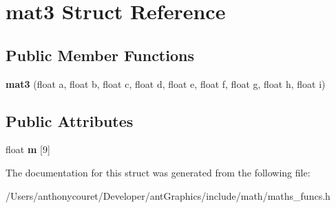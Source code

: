 \hypertarget{structmat3}{\section{mat3 Struct Reference}
\label{structmat3}
}
\subsection*{Public Member Functions}
\begin{DoxyCompactItemize}
\item 
\hypertarget{structmat3_ad5f393d1a6f7986207680e54e81f9906}{{\bfseries mat3} (float a, float b, float c, float d, float e, float f, float g, float h, float i)}\label{structmat3_ad5f393d1a6f7986207680e54e81f9906}

\end{DoxyCompactItemize}
\subsection*{Public Attributes}
\begin{DoxyCompactItemize}
\item 
\hypertarget{structmat3_af5c67cec8668816c844bfd3f097f9eb2}{float {\bfseries m} \mbox{[}9\mbox{]}}\label{structmat3_af5c67cec8668816c844bfd3f097f9eb2}

\end{DoxyCompactItemize}


The documentation for this struct was generated from the following file\+:\begin{DoxyCompactItemize}
\item 
/\+Users/anthonycouret/\+Developer/ant\+Graphics/include/math/maths\+\_\+funcs.\+h\end{DoxyCompactItemize}
